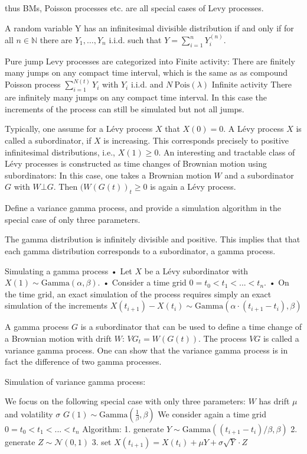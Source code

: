 thus BMs, Poisson processes etc. are all special cases of Levy processes.

A random variable Y has an infinitesimal divisible distribution
if and only if for all 
\( n \in \mathbb{N} \) there are \( Y_1 , \dots, Y_n \) i.i.d. such that \( Y = \sum^n_{i=1} Y_i^{(n)}  \).

Pure jump Levy processes are categorized into
Finite activity: There are finitely many jumps on any compact time interval,
which is the same as as compound Poisson process \(  \sum_{i=1}^{N(t)} Y_i\) with \( Y_i \) i.i.d. and \( N ~ \text{Pois}(\lambda) \) 
Infinite activity
There are infinitely many jumps on any compact time interval.
In this case the increments of the process can still be simulated but not all jumps.

Typically, one assume for a Lévy process \( X \) that \( X(0) = 0 \).
A Lévy process \( X \) is called a subordinator, if \( X \) is increasing. This corresponds precisely to positive infinitesimal distributions, i.e.,
\( X(1) \geq 0 \).
An interesting and tractable class of Lévy processes is constructed as time changes of Brownian motion using subordinators:
In this case, one takes a Brownian motion \( W \) and a subordinator \( G \) with \( W \bot G \).
Then \( (W(G(t))_t \geq 0 \) is again a Lévy process.


Define a variance gamma process, and provide a simulation algorithm in the special
case of only three parameters.

The gamma distribution is infinitely divisible and positive.
This implies that that each gamma distribution corresponds to a subordinator, a gamma process.

Simulating a gamma process
• Let \(X\) be a Lévy subordinator with \(X(1) \sim \text{Gamma}(\alpha, \beta)\).
• Consider a time grid \(0 = t_0 < t_1 < ... < t_n\).
• On the time grid, an exact simulation of the process requires simply an exact simulation of the increments
\(X(t_{i+1}) - X(t_i) \sim \text{Gamma}(\alpha \cdot (t_{i+1} - t_i), \beta)\)

A gamma process \(G\) is a subordinator that can be used to define a time change of a Brownian motion with drift \(W\):
\(VG_{t}=W(G(t)).\)
The process \( VG \) is called a variance gamma process.
One can show that the variance gamma process is in fact the difference of two gamma processes.

Simulation of variance gamma process:

We focus on the following special case with only three parameters:
\( W \) has drift \(\mu\) and volatility \(\sigma\)
\(G(1) \sim \text{Gamma}(\frac{1}{\beta}, \beta)\)
We consider again a time grid \(0 = t_0 < t_1 < ... < t_n\)
Algorithm:
1. generate \(Y \sim \text{Gamma}((t_{i+1} - t_i)/\beta, \beta)\)
2. generate \(Z \sim \mathcal{N}(0,1)\)
3. set \(X(t_{i+1}) = X(t_{i}) + \mu Y + \sigma \sqrt{Y} \cdot Z\)

